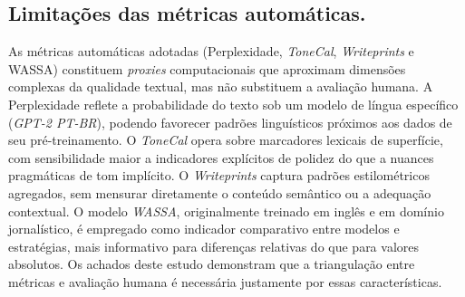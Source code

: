 \documentclass[12pt, a4paper]{article}
\numberwithin{equation}{section}
\begin{document}
 \subsection{Limitações das métricas automáticas.}
 As métricas automáticas adotadas (Perplexidade, \textit{ToneCal}, \textit{Writeprints} e WASSA) 
constituem \textit{proxies} computacionais que aproximam dimensões complexas da qualidade textual,
 mas não substituem a avaliação humana. A Perplexidade reflete a probabilidade do texto sob um 
modelo de língua específico (\textit{GPT-2 PT-BR}), podendo favorecer padrões linguísticos 
próximos aos dados de seu pré-treinamento. O \textit{ToneCal} opera sobre marcadores lexicais de 
superfície, com sensibilidade maior a indicadores explícitos de polidez do que a nuances 
pragmáticas de tom implícito. O \textit{Writeprints} captura padrões estilométricos agregados, sem
 mensurar diretamente o conteúdo semântico ou a adequação contextual. O modelo \textit{WASSA}, 
originalmente treinado em inglês e em domínio jornalístico, é empregado como indicador comparativo
 entre modelos e estratégias, mais informativo para diferenças relativas do que para valores 
absolutos. Os achados deste estudo demonstram que a triangulação entre métricas e avaliação humana
 é necessária justamente por essas características.
\end{document}

